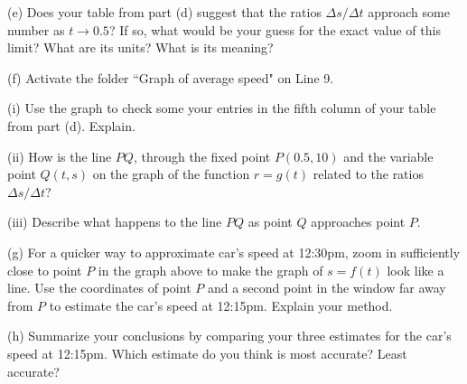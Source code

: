 \documentclass{ximera}
\begin{document}
\begin{example}
(e) Does  your table from part (d) suggest that the ratios $\Delta s/ \Delta t$ approach some number as $t\to 0.5$? If so, what would be your guess for the exact value of this limit? What are its units? What is its meaning?

(f) Activate the folder ``Graph of average speed" on Line 9. 

(i) Use the graph to check some your entries in the fifth column of your table from part (d). Explain.

(ii) How is the line $PQ$, through the fixed point $P(0.5,10)$ and the variable point $Q(t,s)$ on the graph of the function $r=g(t)$ related to the ratios $\Delta s / \Delta t$?

(iii) Describe what happens to the line $PQ$ as point $Q$ approaches point $P$.

(g) For a quicker way to approximate car's speed at 12:30pm, zoom in sufficiently close to point $P$ in the graph above to make the graph of $s=f(t)$ look like a line. Use the coordinates of point $P$ and a second point in the window far away from $P$ to estimate the car's speed at 12:15pm. Explain your method.

(h) Summarize your conclusions by comparing your three estimates for the car's speed at 12:15pm. Which estimate do you think is most accurate? Least accurate?



\end{example}
\end{document}
